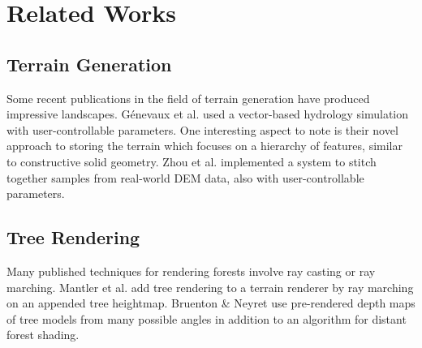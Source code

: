 
\chapter{Related Works} \label{rworks}

\section{Terrain Generation}

Some recent publications in the field of terrain generation have produced impressive landscapes.
G{\'e}nevaux et al. used a vector-based hydrology simulation with user-controllable parameters. \cite{hydrology}
One interesting aspect to note is their novel approach to storing the terrain which focuses on a hierarchy of features, similar to constructive solid geometry.
Zhou et al. implemented a system to stitch together samples from real-world DEM data, also with user-controllable parameters. \cite{DEMsynthesis}

\section{Tree Rendering}

Many published techniques for rendering forests involve ray casting or ray marching.
Mantler et al. add tree rendering to a terrain renderer by ray marching on an appended tree heightmap. \cite{terraintreecast}
Bruenton \& Neyret use pre-rendered depth maps of tree models from many possible angles in addition to an algorithm for distant forest shading. \cite{bruneton_trees}











